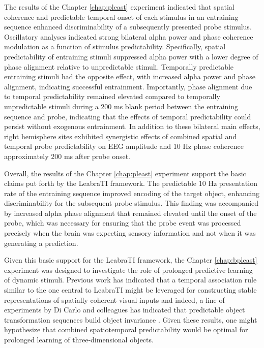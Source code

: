 \documentclass[dwyatte_dissertation.tex]{subfiles}
\begin{document}
The results of the Chapter \ref{chap:pleast} experiment indicated that spatial coherence and predictable temporal onset of each stimulus in an entraining sequence enhanced discriminability of a subsequently presented probe stimulus. Oscillatory analyses indicated strong bilateral alpha power and phase coherence modulation as a function of stimulus predictability. Specifically, spatial predictability of entraining stimuli suppressed alpha power with a lower degree of phase alignment relative to unpredictable stimuli. Temporally predictable entraining stimuli had the opposite effect, with increased alpha power and phase alignment, indicating successful entrainment. Importantly, phase alignment due to temporal predictability remained elevated compared to temporally unpredictable stimuli during a 200 ms blank period between the entraining sequence and probe, indicating that the effects of temporal predictability could persist without exogenous entrainment. In addition to these bilateral main effects, right hemisphere sites exhibited synergistic effects of combined spatial and temporal probe predictability on EEG amplitude and 10 Hz phase coherence approximately 200 ms after probe onset. 

Overall, the results of the Chapter \ref{chap:pleast} experiment support the basic claims put forth by the LeabraTI framework. The predictable 10 Hz presentation rate of the entraining sequence improved encoding of the target object, enhancing discriminability for the subsequent probe stimulus. This finding was accompanied by increased alpha phase alignment that remained elevated until the onset of the probe, which was necessary for ensuring that the probe event was processed precisely when the brain was expecting sensory information and not when it was generating a prediction. 

Given this basic support for the LeabraTI framework, the Chapter \ref{chap:bpleast} experiment was designed to investigate the role of prolonged predictive learning of dynamic stimuli. Previous work has indicated that a temporal association rule similar to the one central to LeabraTI might be leveraged for constructing stable representations of spatially coherent visual inputs \cite{StringerPerryRollsEtAl06,WallisBaddeley97,IsikLeiboPoggio12} and indeed, a line of experiments by Di Carlo and colleagues has indicated that predictable object transformation sequences build object invariance \cite{CoxMeierOerteltEtAl05,LiDiCarlo08,LiDiCarlo10,LiDiCarlo12}. Given these results, one might hypothesize that combined spatiotemporal predictability would be optimal for prolonged learning of three-dimensional objects. 
\end{document}
